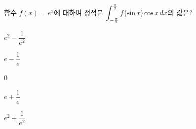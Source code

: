 \hspace*{2mm}\begin{minipage}[t]{\dimexpr\linewidth-2mm\relax}\vspace{0pt}
함수 $f(x)=e^x$에 대하여 정적분 $\displaystyle\int_{-\frac{\pi}{2}}^{\frac{\pi}{2}}f(\sin x)\cos x\mkern3mu dx$의 값은?
\begin{choices32}{\rule[-3ex]{0pt}{8ex}$e^2-\dfrac{1}{e^2}$}{\rule[-3ex]{0pt}{8ex}$e-\dfrac{1}{e}$}{\rule[-3ex]{0pt}{8ex}$0$}{\rule[-3ex]{0pt}{8ex}$e+\dfrac{1}{e}$}{\rule[-3ex]{0pt}{8ex}$e^2+\dfrac{1}{e^2}$}\end{choices32}\end{minipage}
